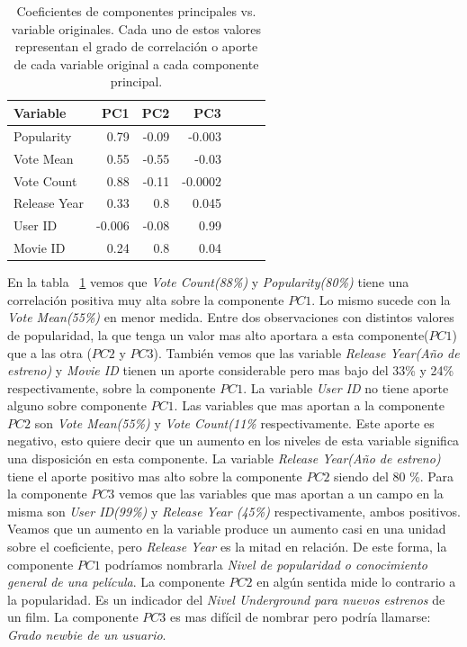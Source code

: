 \documentclass[11pt,a4paper,twoside]{thesis}
\begin{document}
\begin{table}[h!]
	\centering
	\begin{tabular}{lrrrrrr}
			\toprule Variable & PC1    &  PC2  & PC3    \\
			\midrule Popularity  &0.79   & -0.09 & -0.003  \\
					Vote Mean & 0.55   & -0.55 & -0.03      \\
					Vote Count & 0.88   & -0.11 & -0.0002\\
					Release Year & 0.33   &  0.8  &  0.045\\
					User ID & -0.006 & -0.08 &  0.99    \\
					Movie ID & 0.24   &  0.8  &  0.04 \\
			\bottomrule
	\end{tabular}

	\caption{Coeficientes de componentes principales vs. variable originales. Cada uno de estos valores representan el grado de correlación o aporte de cada variable original a cada componente principal.}

	\label{fig:loadingsTable}
\end{table}

En la tabla ~\ref{fig:loadingsTable} vemos que \textit{Vote Count(88\%)} y \textit{Popularity(80\%)} tiene una correlación positiva muy alta sobre la componente $PC1$. Lo mismo sucede con la \textit{Vote Mean(55\%)} en menor medida. Entre dos observaciones con distintos valores de popularidad, la que tenga un valor mas alto aportara a esta componente($PC1$) que a las otra ($PC2$ y $PC3$). También vemos que las variable \textit{Release Year(Año de estreno)} y \textit{Movie ID} tienen un aporte considerable pero mas bajo del 33\% y 24\% respectivamente, sobre la componente $PC1$. La variable \textit{User ID} no tiene aporte alguno sobre componente $PC1$. Las variables que mas aportan a la componente $PC2$ son \textit{Vote Mean(55\%)} y \textit{Vote Count(11\%} respectivamente. Este aporte es negativo, esto quiere decir que un aumento en los niveles de esta variable significa una disposición en esta componente. La variable \textit{Release Year(Año de estreno)} tiene el aporte positivo mas alto sobre la componente $PC2$ siendo del 80 \%. Para la componente $PC3$ vemos que las variables que mas aportan a un campo en la misma son \textit{User ID(99\%)} y \textit{Release Year (45\%)} respectivamente, ambos positivos. Veamos que un aumento en la variable  produce un aumento casi en una unidad sobre el coeficiente, pero \textit{Release Year} es la mitad en relación. De este forma, la componente $PC1$ podríamos nombrarla \textit{Nivel de popularidad o conocimiento general de una película}. La componente $PC2$ en algún sentida mide lo contrario a la popularidad. Es un indicador del \textit{Nivel Underground para nuevos estrenos} de un film.  La componente $PC3$ es mas difícil de nombrar pero podría llamarse: \textit{Grado newbie de un usuario}.
\end{document}
